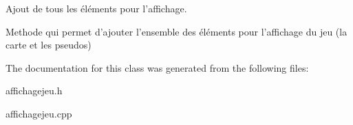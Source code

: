 Ajout de tous les éléments pour l'affichage. 

Methode qui permet d'ajouter l'ensemble des éléments pour l'affichage du jeu (la carte et les pseudos) 

The documentation for this class was generated from the following files\+:\begin{DoxyCompactItemize}
\item 
affichagejeu.\+h\item 
affichagejeu.\+cpp\end{DoxyCompactItemize}
